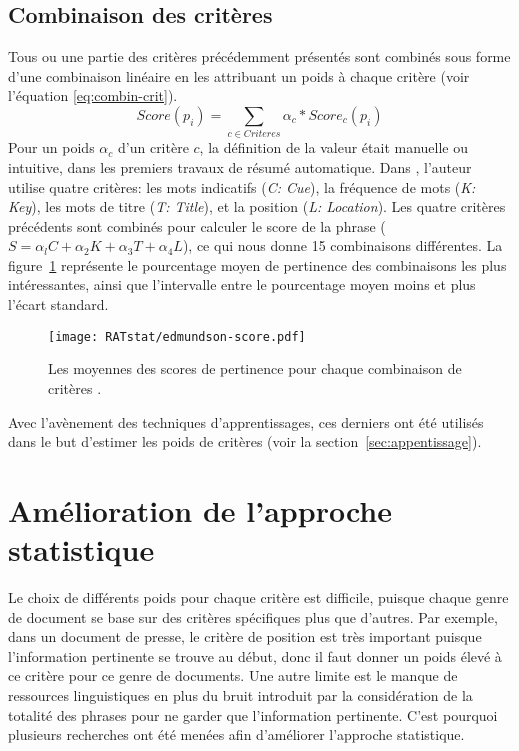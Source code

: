 \documentclass[a4paper,12pt,oneside]{../use/ESIthesis}
\begin{document}
\subsection{Combinaison des critères}

Tous ou une partie des critères précédemment présentés sont combinés sous forme d'une combinaison linéaire en les attribuant un poids à chaque critère (voir l'équation \ref{eq:combin-crit}).
\begin{equation}
\label{eq:combin-crit}
Score(p_i) = \sum_{c \in Criteres}{\alpha_c * Score_c(p_i)}
\end{equation}
Pour un poids $ \alpha_c $ d'un critère $ c $, la définition de la valeur était manuelle ou intuitive, dans les premiers travaux de résumé automatique. 
Dans \cite{69-edmundson}, l'auteur utilise quatre critères: les mots indicatifs (\textit{C: Cue}), la fréquence de mots (\textit{K: Key}), les mots de titre (\textit{T: Title}), et la position (\textit{L: Location}). 
Les quatre critères précédents sont combinés pour calculer le score de la phrase ($ S = \alpha_lC + \alpha_2K + \alpha_3T + \alpha_4L $), ce qui nous donne 15 combinaisons différentes. 
La figure~\ref{fig:edmundson-score} représente le pourcentage moyen de pertinence des combinaisons les plus intéressantes, ainsi que l'intervalle entre le pourcentage moyen moins et plus l'écart standard.
%
\begin{figure}[ht]
\begin{center}
\texttt{[image: RATstat/edmundson-score.pdf]} %
 \caption[Les moyennes des scores de pertinence pour chaque combinaison de critères]{Les moyennes des scores de pertinence pour chaque combinaison de critères \cite{69-edmundson}.}
 \label{fig:edmundson-score}
\end{center}
\end{figure}
Avec l'avènement des techniques d'apprentissages, ces derniers ont été utilisés dans le but d'estimer les poids de critères (voir la section~\ref{sec:appentissage}). 

\section{Amélioration de l'approche statistique}

Le choix de différents poids pour chaque critère est difficile, puisque chaque genre de document se base sur des critères spécifiques plus que d'autres. 
Par exemple, dans un document de presse, le critère de position est très important puisque l'information pertinente se trouve au début, donc il faut donner un poids élevé à ce critère pour ce genre de documents. 
Une autre limite est le manque de ressources linguistiques en plus du bruit introduit par la considération de la totalité des phrases pour ne garder que l'information pertinente.
C'est pourquoi plusieurs recherches ont été menées afin d'améliorer l'approche statistique.
\end{document}
